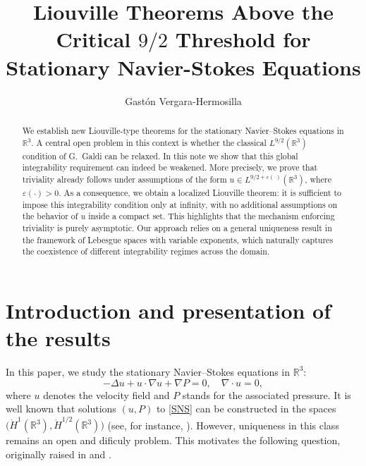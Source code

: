 \documentclass[a4paper,12pt]{amsart}
\theoremstyle{definition}
\theoremstyle{plain}
\begin{document}
	
	
\title[Liouville Theorems Above the Critical ${9/2}$ Threshold]{Liouville Theorems Above the Critical $9/2$ Threshold for Stationary Navier-Stokes Equations}
	
	
	\author{Gast\'{o}n Vergara-Hermosilla}
\address{Institute for Theoretical Sciences, Westlake University, 310030 Hangzhou, Zhejiang, People's
Republic of China}

	\maketitle

\begin{abstract}
We establish new Liouville-type theorems for the stationary Navier--Stokes equations in $\mathbb{R}^3$.
A central open problem in this context is whether the classical $L^{9/2}(\mathbb{R}^3)$ condition of G.~Galdi can be relaxed. In this note we show that this global integrability requirement can indeed be weakened.
More precisely, we prove that triviality already follows under assumptions of the form $u \in L^{9/2 + \varepsilon(\cdot)}(\mathbb{R}^3)$, where $\varepsilon(\cdot)>0$. 
As a consequence, we obtain a localized Liouville theorem: it is sufficient to impose this  integrability condition only at infinity, with no additional assumptions on the behavior of $u$ inside a compact set. This highlights that the mechanism enforcing triviality is purely asymptotic.
Our approach relies on a general uniqueness result in the framework of Lebesgue spaces with variable exponents, which naturally captures the coexistence of different integrability regimes across the domain.
\end{abstract}


\section{Introduction and presentation of the results}
In this paper, we study the stationary Navier--Stokes equations in $\mathbb{R}^3$:
\begin{equation}\label{SNS}
-\Delta u + u \cdot \nabla u + \nabla P = 0, \quad 
\nabla \cdot u = 0,
\end{equation}
where $u$ denotes the velocity field and $P$ stands for the associated pressure. 
It is well known that solutions $(u,P)$ to \eqref{SNS} can be constructed in the spaces $\big(\dot{H}^1(\mathbb{R}^3), \dot{H}^{1/2}(\mathbb{R}^3)\big)$ (see, for instance, \cite[Theorem 16.2]{lemarie2016navier}). However, uniqueness in this class remains an open and dificuly problem. 
This motivates the following question, originally raised in \cite[Remark X.9.4]{galdi2011introduction} and \cite{Ser2016}.
\end{document}
